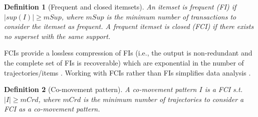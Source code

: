 \documentclass[
]{ceurart}
\newtheorem{example}{Example}
\newtheorem{definition}{Definition}
\begin{document}

\begin{definition}[Frequent and closed itemsets]\label{def:fci}
An itemset is \textit{frequent} (FI) if $|sup(I)|\geq mSup$, where $mSup$ is the minimum number of transactions to consider the itemset as frequent.
A frequent itemset is \textit{closed} (FCI) if there exists no superset with the same support. 
\end{definition}

FCIs provide a lossless compression of FIs \citep{DBLP:conf/dmkd/PeiHM00} (i.e., the output is non-redundant and the complete set of FIs is recoverable) which are exponential in the number of trajectories/items \citep{DBLP:conf/vldb/AgrawalS94}. 
Working with FCIs rather than FIs simplifies data analysis \citep{DBLP:journals/isci/FranciaGR20}.

\begin{definition}[Co-movement pattern]\label{def:comov}
A \textit{co-movement pattern} $I$ is a FCI s.t. $|I| \ge mCrd$, where $mCrd$ is the minimum number of trajectories to consider a FCI as a co-movement pattern.
\end{definition}
\end{document}
